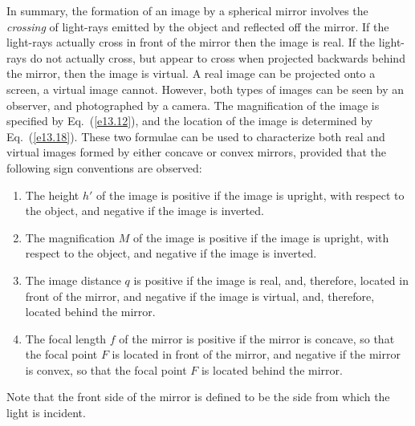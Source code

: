 In summary, the formation of an image by a spherical mirror involves the
{\em crossing} of light-rays emitted by the object and reflected off
the mirror. If the light-rays actually cross in front of the
mirror then the image is real. If the light-rays do not
actually cross, but appear to cross when projected backwards
behind the mirror, then the image is virtual. A real image
can be projected onto a screen, a virtual image cannot. 
However, both
types of images can be seen by an observer, and photographed by a
camera. The magnification of the image
is specified by Eq.~(\ref{e13.12}), and the location of the image is determined
 by
Eq.~(\ref{e13.18}). These two formulae can be used to characterize both real
and virtual images formed by either concave or convex mirrors, provided
that the following sign conventions are observed:
\begin{enumerate}
\item The height $h'$ of the image is positive if the image is
upright, with respect to the object, and negative if the image
is inverted. 
\item The magnification $M$ of the image is positive if the image is
upright, with respect to the object, and negative if the image
is inverted. 
\item The image distance $q$ is positive if the image is real, and,
therefore, located in front of the mirror, and  negative if the
image is virtual, and, therefore, located behind the mirror. 
\item The focal length $f$  of
the mirror is positive if the mirror is concave, so that the focal
point $F$  is located in front of
the mirror, and negative if the mirror is convex, so that the focal
point $F$  is located behind
the mirror.
\end{enumerate}
Note that  the front side of the mirror is defined
to be  the side from which the light is incident. 

